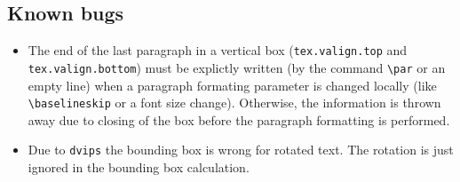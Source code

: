\subsection{Known bugs}
\begin{itemize}
\item The end of the last paragraph in a vertical box
(\verb|tex.valign.top| and \verb|tex.valign.bottom|) must be explictly
written (by the command \verb|\par| or an empty line) when a paragraph
formating parameter is changed locally (like \verb|\baselineskip| or a
font size change).  Otherwise, the information is thrown away due to
closing of the box before the paragraph formatting is performed.
\item Due to \verb|dvips| the bounding box is wrong for rotated text.
The rotation is just ignored in the bounding box calculation.
\end{itemize}
